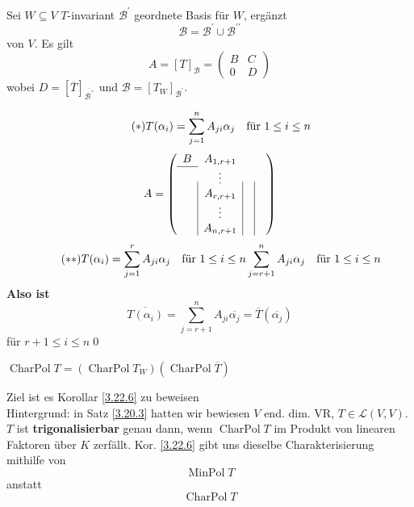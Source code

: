\begin{subtheorem}
	Sei $ W \subseteq V $ $ T $-invariant $ \mathcal{B} ^\prime  $ geordnete Basis für $ W $, ergänzt
	\[
		\mathcal{B} = \mathcal{B} ^\prime \cup \mathcal{B} ^{\prime\prime} 
	\]
	von $ V $.
	Es gilt
	\[
		A = [T]_\mathcal{B} = \begin{pmatrix} B & C \\ 0 & D \end{pmatrix} 
	\]
	wobei $ D = \left[ \overline{T}  \right]_{\overline{\mathcal{B} ^{\prime\prime} } }  $ 
	und $ \mathcal{B} = \left[ T_W \right]_{\mathcal{B} ^\prime }  $.
\end{subtheorem}
\begin{subproof}
	\begin{equation}
		\label{3.22.2.1}
		\tag{$ * $}
		T(\alpha_i) = \sum_{j=1}^{n} A_{ji} \alpha_j \quad \text{für $ 1 \leq i \leq n $} 
	\end{equation}
	\[
		A =
		\left( 
			\begin{array}{c|c|c|c}
				B & A_{1, r + 1} & & \\\cline{1-1}
				  & \vdots & & \\
				  & A_{r, r + 1} & & \\
				  & \vdots & & \\
				  & A_{n, r + 1} & &
			\end{array}
		\right) 
	\]
	\begin{equation}
		\label{3.22.2.2}
		\tag{$ ** $}
		T(\alpha_i) = \sum_{j=1}^{r} A_{ji} \alpha_j \quad \text{für $ 1 \leq i \leq n $} \sum_{j=r + 1}^{n} A_{ji} \alpha_j \quad \text{für $ 1 \leq i \leq n $} 
	\end{equation}
	\textbf{Also ist}
	\[
		\overline{T(\alpha_i)} = \sum_{j=r + 1}^{n} A_{ji} \overline{\alpha_j} = \overline{T} \left( \overline{\alpha_j}  \right) 
	\]
	für $ r + 1 \leq  i \leq n $\qed
\end{subproof}

\begin{subcorollary}
	$ \operatorname{Char Pol} T = \left( \operatorname{Char Pol} T_W \right) \left( \operatorname{Char Pol} \overline{T}  \right)  $
\end{subcorollary}

Ziel ist es Korollar \ref{3.22.6} zu beweisen\\
Hintergrund: in Satz \ref{3.20.3} hatten wir bewiesen $ V $ end. dim. VR, $ T \in \mathcal{L} (V, V) $.\\
$ T $ ist \textbf{trigonalisierbar} genau dann, wenn \textbf{$ \operatorname{Char Pol} T $} im Produkt von linearen Faktoren über $ K $ zerfällt.
{
	\color{gadse-red} Kor. \ref{3.22.6} gibt uns dieselbe Charakterisierung mithilfe von
	\[
		\operatorname{Min Pol} T
	\]
	anstatt
	\[
		\operatorname{Char Pol} T
	\]
}

